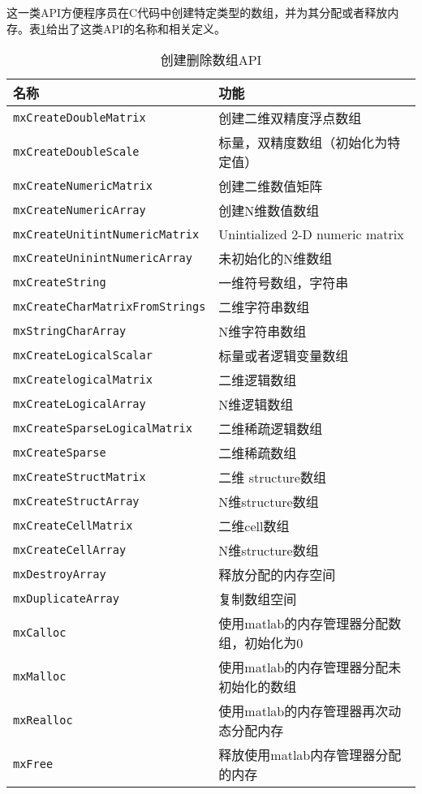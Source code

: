 \documentclass[10pt,a4paper,UTF8]{article}
\begin{document}
这一类API方便程序员在C代码中创建特定类型的数组，并为其分配或者释放内存。表\ref{tab:orgtable2}给出了这类API的名称和相关定义。
\begin{table}[htb]
\caption{\label{tab:orgtable2}
创建删除数组API}
\centering
\begin{tabular}{ll}
\hline
名称 & 功能\\
\hline
\texttt{mxCreateDoubleMatrix} & 创建二维双精度浮点数组\\
\texttt{mxCreateDoubleScale} & 标量，双精度数组（初始化为特定值）\\
\texttt{mxCreateNumericMatrix} & 创建二维数值矩阵\\
\texttt{mxCreateNumericArray} & 创建N维数值数组\\
\texttt{mxCreateUnitintNumericMatrix} & Unintialized 2-D numeric matrix\\
\texttt{mxCreateUninintNumericArray} & 未初始化的N维数组\\
\texttt{mxCreateString} & 一维符号数组，字符串\\
\texttt{mxCreateCharMatrixFromStrings} & 二维字符串数组\\
\texttt{mxStringCharArray} & N维字符串数组\\
\texttt{mxCreateLogicalScalar} & 标量或者逻辑变量数组\\
\texttt{mxCreatelogicalMatrix} & 二维逻辑数组\\
\texttt{mxCreateLogicalArray} & N维逻辑数组\\
\texttt{mxCreateSparseLogicalMatrix} & 二维稀疏逻辑数组\\
\texttt{mxCreateSparse} & 二维稀疏数组\\
\texttt{mxCreateStructMatrix} & 二维 structure数组\\
\texttt{mxCreateStructArray} & N维structure数组\\
\texttt{mxCreateCellMatrix} & 二维cell数组\\
\texttt{mxCreateCellArray} & N维structure数组\\
\texttt{mxDestroyArray} & 释放分配的内存空间\\
\texttt{mxDuplicateArray} & 复制数组空间\\
\texttt{mxCalloc} & 使用matlab的内存管理器分配数组，初始化为0\\
\texttt{mxMalloc} & 使用matlab的内存管理器分配未初始化的数组\\
\texttt{mxRealloc} & 使用matlab的内存管理器再次动态分配内存\\
\texttt{mxFree} & 释放使用matlab内存管理器分配的内存\\
\hline
\end{tabular}
\end{table}
\end{document}
